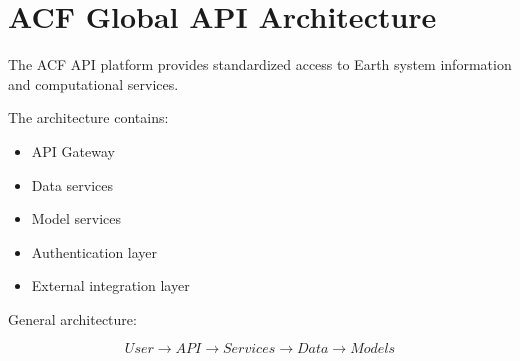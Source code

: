 \section{ACF Global API Architecture}


The ACF API platform provides standardized access to Earth
system information and computational services.



The architecture contains:


\begin{itemize}

\item API Gateway

\item Data services

\item Model services

\item Authentication layer

\item External integration layer

\end{itemize}



General architecture:


\begin{equation}
User
\rightarrow
API
\rightarrow
Services
\rightarrow
Data
\rightarrow
Models
\end{equation}
